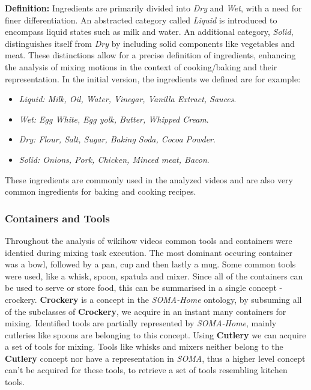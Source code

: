 \textbf{Definition:}
Ingredients are primarily divided into \textit{Dry} and \textit{Wet}, with a need for finer differentiation. An abstracted category called \textit{Liquid} is introduced to encompass liquid states such as milk and water. An additional category, \textit{Solid}, distinguishes itself from \textit{Dry} by including solid components like vegetables and meat. These distinctions allow for a precise definition of ingredients, enhancing the analysis of mixing motions in the context of cooking/baking and their representation.
In the initial version, the ingredients we defined are for example:
\begin{itemize}
  \item \textit{Liquid: Milk, Oil, Water, Vinegar, Vanilla Extract, Sauces}.
  \item \textit{Wet: Egg White, Egg yolk, Butter, Whipped Cream}.
  \item \textit{Dry: Flour, Salt, Sugar, Baking Soda, Cocoa Powder}.
  \item \textit{Solid: Onions, Pork, Chicken, Minced meat, Bacon}.
\end{itemize}
These ingredients are commonly used in the analyzed videos and are also very common ingredients for baking and cooking recipes.


\subsubsection{Containers and Tools}
\label{sec:ContainersAndToolsAcquisition}
Throughout the analysis of wikihow videos common tools and containers were identied during mixing task execution.
The most dominant occuring container was a bowl, followed by a pan, cup and then lastly a mug. Some common tools were used, like a whisk, spoon, spatula and mixer.
Since all of the containers can be used to serve or store food, this can be summarised in a single concept - crockery. \textbf{Crockery} is a concept in the \textit{SOMA-Home} \cite{soma}
ontology, by subsuming all of the subclasses of \textbf{Crockery}, we acquire in an instant many containers for mixing. Identified tools are partially represented by \textit{SOMA-Home},
mainly cutleries like spoons are belonging to this concept. Using \textbf{Cutlery} we can acquire a set of tools for mixing. Tools like whisks and mixers neither belong 
to the \textbf{Cutlery} concept nor have a representation in \textit{SOMA}, thus a higher level concept can't be acquired for these tools, to retrieve a set of tools resembling
kitchen tools. 

